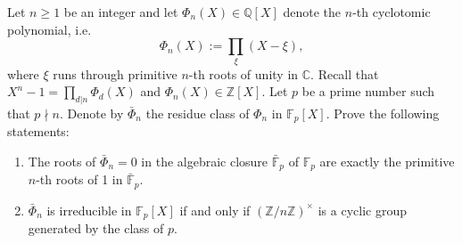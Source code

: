 \begin{exercise}
\label{algebra:2018:8}
Let $n \geq 1$ be an integer and let $\Phi_n(X) \in \mathbb{Q}[X]$ denote the $n$-th cyclotomic polynomial, i.e.
\[
\Phi_n(X) := \prod_\xi (X - \xi),
\]
where $\xi$ runs through primitive $n$-th roots of unity in $\mathbb{C}$. Recall that $X^n - 1 = \prod_{d|n} \Phi_d(X)$ and $\Phi_n(X) \in \mathbb{Z}[X]$. Let $p$ be a prime number such that $p \nmid n$. Denote by $\bar{\Phi}_n$ the residue class of $\Phi_n$ in $\mathbb{F}_p[X]$. Prove the following statements:
\begin{enumerate}
    \item The roots of $\bar{\Phi}_n = 0$ in the algebraic closure $\bar{\mathbb{F}}_p$ of $\mathbb{F}_p$ are exactly the primitive $n$-th roots of 1 in $\bar{\mathbb{F}}_p$.
    \item $\bar{\Phi}_n$ is irreducible in $\mathbb{F}_p[X]$ if and only if $(\mathbb{Z}/n\mathbb{Z})^\times$ is a cyclic group generated by the class of $p$.
\end{enumerate}
\end{exercise}

